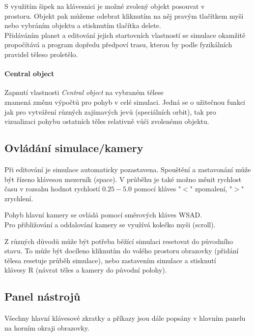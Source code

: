 \documentclass[a4paper, 12pt]{article}
\begin{document}
S využitím šipek na klávesnici je možné zvolený objekt posouvat v
\\prostoru. Objekt pak můžeme odebrat kliknutím na něj pravým tlačítkem myši
nebo vybráním objektu a stisknutím tlačítka delete.\\
\linebreak
Přidáváním planet a editování jejich startovních vlastností se simulace
okamžitě propočítává a program dopředu předpoví trasu, kterou by podle
fyzikálních pravidel těleso proletělo.

\paragraph{Central object}
Zapnutí vlastnosti \emph{Central object} na vybraném tělese \\znamená změnu
výpočtů pro pohyb v celé simulaci. Jedná se o užitečnou funkci jak pro
vytváření různých zajímavých jevů (speciálních orbit), tak pro \\vizualizaci
pohybu ostatních těles relativně vůči zvolenému objektu.

\newpage
\subsection{Ovládání simulace/kamery}
\paragraph{}
Při editování je simulace automaticky pozastavena. Spouštění a zastavonání může
být řízeno klávesou mezerník (space). V průběhu je také možno měnit rychlost
času v rozsahu hodnot rychlostí $0.25-5.0$ pomocí kláves "$<$" zpomalení, "$>$"
zrychlení.

Pohyb hlavní kamery se ovládá pomocí směrových kláves WSAD. \\Pro přibližování a
oddalování kamery se využívá kolečko myši (scroll).

Z různých důvodů může být potřeba běžící simulaci resetovat do původního stavu. To
může být docíleno kliknutím do volého prostoru obrazovky (přidání tělesa
resetuje průběh simulace), nebo zastavením simulace a stisknutí\\ klávesy R
(návrat těles a kamery do původní polohy).

\subsection{Panel nástrojů}
\paragraph{}
Všechny hlavní klávesové zkratky a příkazy jsou dále popsány v hlavním panelu
na horním okraji obrazovky.
\end{document}
